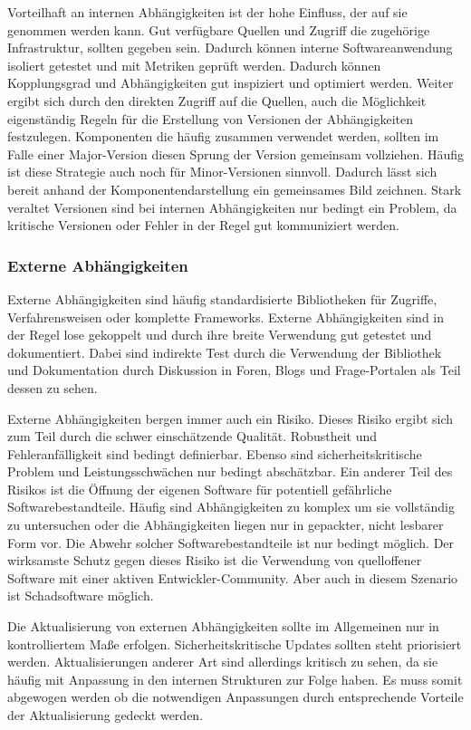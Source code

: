 Vorteilhaft an internen Abhängigkeiten ist der hohe Einfluss, der auf sie genommen werden kann. Gut verfügbare Quellen und Zugriff die zugehörige Infrastruktur, sollten gegeben sein. Dadurch können interne Softwareanwendung isoliert getestet und mit Metriken geprüft werden. Dadurch können Kopplungsgrad und Abhängigkeiten gut inspiziert und optimiert werden. Weiter ergibt sich durch den direkten Zugriff auf die Quellen, auch die Möglichkeit eigenständig Regeln für die Erstellung von Versionen der Abhängigkeiten festzulegen. Komponenten die häufig zusammen verwendet werden, sollten im Falle einer Major-Version diesen Sprung der Version gemeinsam vollziehen. Häufig ist diese Strategie auch noch für Minor-Versionen sinnvoll. Dadurch lässt sich bereit anhand der Komponentendarstellung ein gemeinsames Bild zeichnen. Stark veraltet Versionen sind bei internen Abhängigkeiten nur bedingt ein Problem, da kritische Versionen oder Fehler in der Regel gut kommuniziert werden.

\subsubsection{Externe Abhängigkeiten}

Externe Abhängigkeiten sind häufig standardisierte Bibliotheken für Zugriffe, Verfahrensweisen oder komplette Frameworks. Externe Abhängigkeiten sind in der Regel lose gekoppelt und durch ihre breite Verwendung gut getestet und dokumentiert. Dabei sind indirekte Test durch die Verwendung der Bibliothek und Dokumentation durch Diskussion in Foren, Blogs und Frage-Portalen als Teil dessen zu sehen. 

Externe Abhängigkeiten bergen immer auch ein Risiko. Dieses Risiko ergibt sich zum Teil durch die schwer einschätzende Qualität. Robustheit und Fehleranfälligkeit sind bedingt definierbar. Ebenso sind sicherheitskritische Problem und Leistungsschwächen nur bedingt abschätzbar. Ein anderer Teil des Risikos ist die Öffnung der eigenen Software für potentiell gefährliche Softwarebestandteile. Häufig sind Abhängigkeiten zu komplex um sie vollständig zu untersuchen oder die Abhängigkeiten liegen nur in gepackter, nicht lesbarer Form vor. Die Abwehr solcher Softwarebestandteile ist nur bedingt möglich. Der wirksamste Schutz gegen dieses Risiko ist die Verwendung von quelloffener Software mit einer aktiven Entwickler-Community. Aber auch in diesem Szenario ist Schadsoftware möglich.

Die Aktualisierung von externen Abhängigkeiten sollte im Allgemeinen nur in kontrolliertem Maße erfolgen. Sicherheitskritische Updates sollten steht priorisiert werden. Aktualisierungen anderer Art sind allerdings kritisch zu sehen, da sie häufig mit Anpassung in den internen Strukturen zur Folge haben. Es muss somit abgewogen werden ob die notwendigen Anpassungen durch entsprechende Vorteile der Aktualisierung gedeckt werden.

